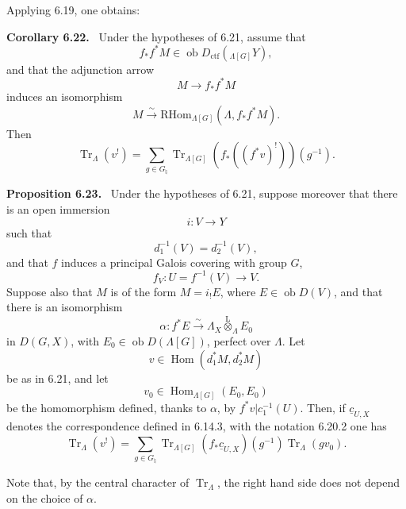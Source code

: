 \documentclass[11pt]{article}
\newenvironment{statement}[1]{\par\medskip\noindent\textbf{#1.}\ }{\par\medskip}
\DeclareMathOperator{\Hom}{Hom}
\providecommand{\RHom}{\mathrm{RHom}}
\providecommand{\Tr}{\operatorname{Tr}}
\providecommand{\Tr}{\operatorname{Tr}}
\providecommand{\lten}{\overset{\mathrm L}{\otimes}}
\providecommand{\Ob}{\operatorname{ob}}
\providecommand{\Tr}{\operatorname{Tr}}
\providecommand{\RHom}{\mathrm{RHom}}
\providecommand{\Hom}{\operatorname{Hom}}
\providecommand{\lten}{\overset{\mathrm L}{\otimes}}
\providecommand{\RHom}{\mathrm R\mathcal{H}om}
\providecommand{\lten}{\overset{\mathrm L}{\otimes}}
\providecommand{\Ob}{\operatorname{ob}}
\providecommand{\Tr}{\operatorname{Tr}}
\providecommand{\lten}{\overset{\mathrm L}{\otimes}}
\providecommand{\lten}{\overset{\mathrm L}{\otimes}}
\providecommand{\Ob}{\operatorname{Ob}}
\providecommand{\lten}{\overset{\mathrm L}{\otimes}}
\providecommand{\RHom}{\mathrm{RHom}}
\begin{document}
Applying 6.19, one obtains:

\begin{statement}{Corollary 6.22}
Under the hypotheses of 6.21, assume that
\[
f_*f^*M\in\Ob D_{\mathrm{ctf}}({}_{\Lambda[G]}Y),
\]
and that the adjunction arrow
\[
M\to f_*f^*M
\]
induces an isomorphism
\[
M\xrightarrow{\sim}\RHom_{\Lambda[G]}(\Lambda,f_*f^*M).
\]
Then
\begin{equation}
\Tr_{\Lambda}(v^!)=
\sum_{g\in G_{\natural}}\Tr_{\Lambda[G]}(f_*((f^*v)^!))(g^{-1}).
\tag{6.22.1}
\end{equation}
\end{statement}

\begin{statement}{Proposition 6.23}
Under the hypotheses of 6.21, suppose moreover that there is an open immersion
\[
i:V\to Y
\]
such that
\[
d_1^{-1}(V)=d_2^{-1}(V),
\]
and that $f$ induces a principal Galois covering with group $G$,
\[
f_V:U=f^{-1}(V)\to V.
\]
Suppose also that $M$ is of the form $M=i_!E$, where $E\in\Ob D(V)$, and that there is an isomorphism
\[
\alpha:f^*E\xrightarrow{\sim}\Lambda_X\lten_{\Lambda}E_0
\]
in $D(G,X)$, with $E_0\in\Ob D(\Lambda[G])$, perfect over $\Lambda$. Let
\[
v\in\Hom(d_1^*M,d_2^*M)
\]
be as in 6.21, and let
\[
v_0\in\Hom_{\Lambda[G]}(E_0,E_0)
\]
be the homomorphism defined, thanks to $\alpha$, by $f^*v|c_1^{-1}(U)$. Then, if $\underline c_{U,X}$ denotes the correspondence defined in 6.14.3, with the notation 6.20.2 one has
\begin{equation}
\Tr_{\Lambda}(v^!)
=
\sum_{g\in G_{\natural}}
\Tr_{\Lambda[G]}(f_*\underline c_{U,X})(g^{-1})\Tr_{\Lambda}(gv_0).
\tag{6.23.1}
\end{equation}
\end{statement}

Note that, by the central character of $\Tr_{\Lambda}$, the right hand side does not depend on the choice of $\alpha$.
\end{document}
